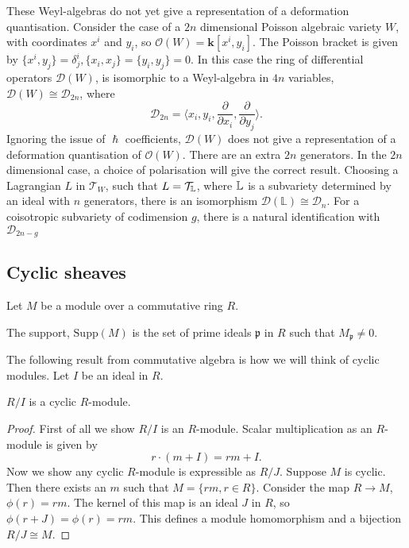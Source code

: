     These Weyl-algebras do not yet give a representation of a deformation quantisation. Consider the case of a \(2n\) dimensional Poisson algebraic variety \(W\), with coordinates \( x^i\) and \(y_i\), so 
    \( \mathcal{O}(W) = \mathbf{k}[x^i, y_i]\). The Poisson bracket is given by \( \{x^i, y_j \} = \delta_{j}^i, \{x_i,x_j\} = \{y_i,y_j \} = 0\). 
    In this case the ring of differential operators \( \mathcal{D}(W) \), is isomorphic to a Weyl-algebra in \(4n\) variables, \( \mathcal{D}(W) \cong \mathcal{D}_{2n}\), where \[\mathcal{D}_{2n} = \langle  x_i, y_i, \frac{\partial}{ \partial x_i}, \frac{\partial}{ \partial y_j} \rangle  .\] 
    Ignoring the issue of \( \hslash \) coefficients, \( \mathcal{D}(W)\) does not give a representation of a deformation quantisation of \( \mathcal{O}(W) \). There are an extra \(2n\) generators. In the \(2n\) dimensional case, a choice of polarisation will give the correct result. Choosing a Lagrangian \(L\) in \(\mathcal{T}_W\), such that \( L = \mathcal{T}_{\mathbb{L}} \), where \( \mathbb{L}\) is a subvariety
    determined by an ideal with \(n\) generators, there is an isomorphism \(\mathcal{D}(\mathbb{L})  \cong \mathcal{D}_n\). For a coisotropic subvariety of codimension \(g\),  there is a natural identification with \( \mathcal{D}_{2n-g}\) 
            
    \subsection{Cyclic sheaves}
     Let \(M\) be a module over a commutative ring \(R\). 
    \begin{defn}[Support]
    The support, \( \mathrm{Supp}(M)\) is the set of prime ideals \( \mathfrak{p}\) in \(R\) such that \(M_{\mathfrak{p}} \neq 0\).
    \end{defn}
    
    The following result from commutative algebra is how we will think of cyclic modules. Let \(I\) be an ideal in \(R\).
    \begin{lem}
    \(R/I\) is a cyclic \(R\)-module.
    \end{lem}
    \begin{proof}
    First of all we show \(R/I\) is an \(R\)-module. Scalar multiplication as an \(R\)-module is given by
    \[ r \cdot ( m + I) = r m + I. \]
    Now we show any cyclic \(R\)-module is expressible as \(R/J\). Suppose \(M\) is cyclic. Then there exists an \(m\) such that \( M  = \{ r m , r \in R \}\). Consider the map \(R \rightarrow M\), \( \phi(r) = r m\). The kernel of this map is an ideal \(J\) in \(R\), so \( \phi(r + J) = \phi(r) = r m\). This defines a module homomorphism and a bijection \(R/J \cong M\).
    \end{proof}
    

